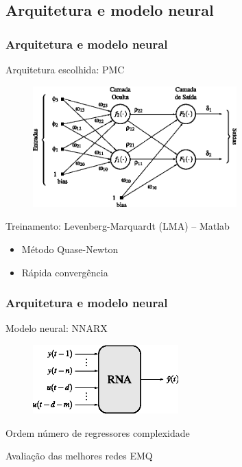 \documentclass{beamer}
\begin{document}
\subsection{Arquitetura e modelo neural}
\begin{frame}
    \frametitle{Arquitetura e modelo neural}

    Arquitetura escolhida: PMC

\begin{figure}[htb]
\centering
    \includegraphics[width=0.7\textwidth]{imgs/rnas/eps/pmc}
\end{figure}

    Treinamento: Levenberg-Marquardt (LMA) -- Matlab\reg

\begin{itemize}
    \item Método Quase-Newton
    \item Rápida convergência
\end{itemize}

\end{frame}

\begin{frame}
    \frametitle{Arquitetura e modelo neural}

    Modelo neural: NNARX
\begin{figure}[htb]
\centering
    \includegraphics[width=0.5\textwidth]{imgs/rnas/eps/nnarx}
\end{figure}

    Ordem \implica número de regressores \implica complexidade

    \vspace{0.25cm}

    Avaliação das melhores redes \implica EMQ
\end{frame}
\end{document}
